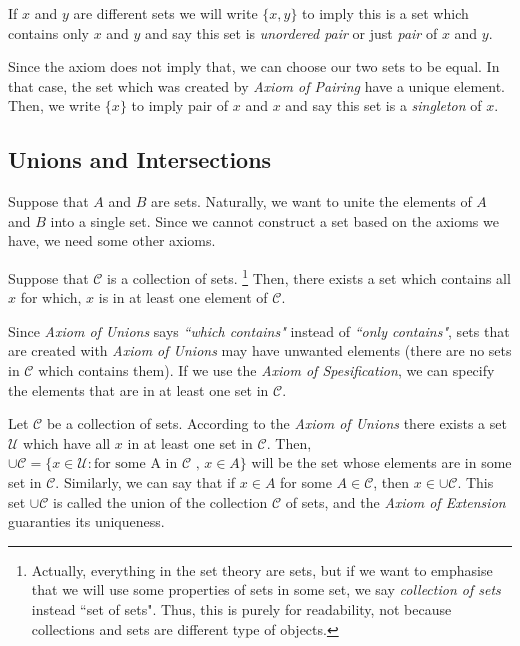 If $x$ and $y$ are different sets we will write $\{x,y\}$ to imply 
this is a set which contains only $x$ and $y$ and say this set is 
\textit{unordered pair} or just \textit{pair} of $x$ and $y$.

Since the axiom does not imply that, we can choose our two sets to be equal.
In that case, the set which was created by \textit{Axiom of Pairing} have 
a unique element. Then, we write $\{x\}$ to imply pair of $x$ and $x$ and
say this set is a \textit{singleton} of $x$.

\subsection{Unions and Intersections}
Suppose that $A$ and $B$ are sets. Naturally, we want to unite the 
elements of $A$ and $B$ into a single set.
Since we cannot construct a set based on the axioms we have,
we need some other axioms.

\begin{axiom*} Suppose that $\mathcal{C}$ is a collection of sets.
\footnote{Actually, everything in the set theory are sets, but if we 
want to emphasise that we will use some properties of sets in some set,
we say \textit{collection of sets} instead ``set of sets". Thus,
this is purely for readability, not because collections and sets are different 
type of objects.} Then, there
exists a set which contains all $x$ for which, $x$ is in at least one element 
of $\mathcal{C}$.\end{axiom*}

Since \textit{Axiom of Unions} says \textit{``which contains"} instead of 
\textit{``only contains"}, sets that are created with \textit{Axiom of Unions}
may have unwanted elements (there are no sets in $\mathcal{C}$ which contains them).
If we use the \textit{Axiom of Spesification}, we can specify the elements 
that are in at least one set in $\mathcal{C}$.

Let $\mathcal{C}$ be a collection of sets. According to the 
\textit{Axiom of Unions} there exists a set $\mathcal{U}$ which have 
all $x$ in at least one set in $\mathcal{C}$. 
Then, $\cup \mathcal{C} = \{x \in \mathcal{U} : 
\text{for some A in } \mathcal{C} \text{ , } x \in A\}$
will be the set whose elements are in some set in $\mathcal{C}$. Similarly,
we can say that if $x \in A$ for some $A \in \mathcal{C}$, then $x \in \cup \mathcal{C}$.
This set $\cup \mathcal{C}$ is called the union of the collection $\mathcal{C}$
of sets, and the \textit{Axiom of Extension} guaranties its uniqueness.

